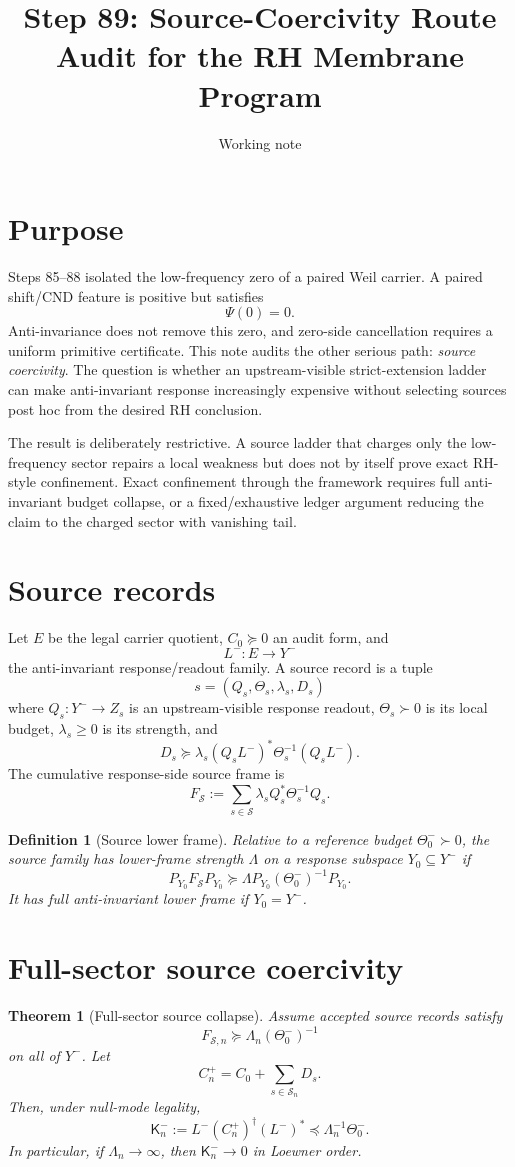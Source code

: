 \documentclass[11pt]{article}
\title{Step 89: Source-Coercivity Route Audit for the RH Membrane Program}
\author{Working note}
\date{}
\newtheorem{theorem}{Theorem}
\newtheorem{definition}{Definition}
\newcommand{\K}{\mathsf K}
\newcommand{\pre}{\preceq}
\newcommand{\suc}{\succeq}
\begin{document}
\maketitle

\section{Purpose}
Steps 85--88 isolated the low-frequency zero of a paired Weil carrier.  A paired shift/CND feature is positive but satisfies
\[
  \Psi(0)=0.
\]
Anti-invariance does not remove this zero, and zero-side cancellation requires a uniform primitive certificate.  This note audits the other serious path: \emph{source coercivity}.  The question is whether an upstream-visible strict-extension ladder can make anti-invariant response increasingly expensive without selecting sources post hoc from the desired RH conclusion.

The result is deliberately restrictive.  A source ladder that charges only the low-frequency sector repairs a local weakness but does not by itself prove exact RH-style confinement.  Exact confinement through the framework requires full anti-invariant budget collapse, or a fixed/exhaustive ledger argument reducing the claim to the charged sector with vanishing tail.

\section{Source records}
Let $E$ be the legal carrier quotient, $C_0\suc0$ an audit form, and
\[
  L^-:E\to Y^-
\]
the anti-invariant response/readout family.  A source record is a tuple
\[
  s=(Q_s,\Theta_s,\lambda_s,D_s)
\]
where $Q_s:Y^-\to Z_s$ is an upstream-visible response readout, $\Theta_s\succ0$ is its local budget, $\lambda_s\ge0$ is its strength, and
\[
  D_s\suc \lambda_s (Q_sL^-)^*\Theta_s^{-1}(Q_sL^-).
\]
The cumulative response-side source frame is
\[
  F_{\mathcal S}:=\sum_{s\in\mathcal S}\lambda_s Q_s^*\Theta_s^{-1}Q_s.
\]

\begin{definition}[Source lower frame]
Relative to a reference budget $\Theta_0^-\succ0$, the source family has lower-frame strength $\Lambda$ on a response subspace $Y_0\subseteq Y^-$ if
\[
  P_{Y_0}F_{\mathcal S}P_{Y_0}\suc \Lambda P_{Y_0}(\Theta_0^-)^{-1}P_{Y_0}.
\]
It has full anti-invariant lower frame if $Y_0=Y^-$.
\end{definition}

\section{Full-sector source coercivity}
\begin{theorem}[Full-sector source collapse]
Assume accepted source records satisfy
\[
  F_{\mathcal S,n}\suc \Lambda_n(\Theta_0^-)^{-1}
\]
on all of $Y^-$.  Let
\[
  C_n^+=C_0+\sum_{s\in\mathcal S_n}D_s.
\]
Then, under null-mode legality,
\[
  \K_n^-:=L^-(C_n^+)^\dagger(L^-)^*\pre \Lambda_n^{-1}\Theta_0^-.
\]
In particular, if $\Lambda_n\to\infty$, then $\K_n^-\to0$ in Loewner order.
\end{theorem}
\end{document}
